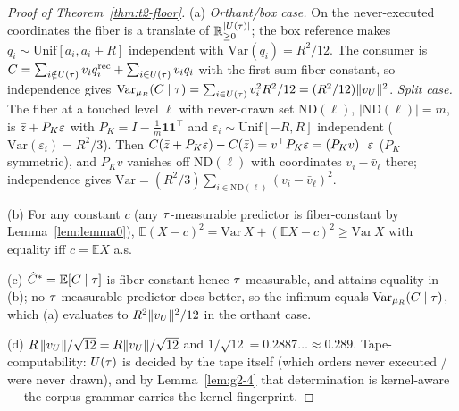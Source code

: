 \begin{proof}[Proof of Theorem~\ref{thm:t2-floor}]
(a) \emph{Orthant/box case.} On the never-executed coordinates the fiber is
a translate of $\mathbb{R}_{\ge 0}^{|U(\tau)|}$; the box reference makes
$q_i \sim \mathrm{Unif}[a_i, a_i + R]$ independent with
$\mathrm{Var}(q_i) = R^2/12$. The consumer is
$C = \sum_{i \notin U(\tau)} v_i q_i^{\mathrm{rec}} + \sum_{i \in U(\tau)}
v_i q_i$ with the first sum fiber-constant, so independence gives
$\mathrm{Var}_{\mu_{R}}(C \mid \tau) = \sum_{i \in U(\tau)} v_i^2 R^2/12 =
(R^2/12)\|v_{U}\|^2$. \emph{Split case.} The fiber at a touched level $\ell$
with never-drawn set $\mathrm{ND}(\ell)$, $|\mathrm{ND}(\ell)| = m$, is
$\bar{z} + P_K\varepsilon$ with
$P_K = I - \tfrac{1}{m}\mathbf{1}\mathbf{1}^{\top}$ and
$\varepsilon_i \sim \mathrm{Unif}[-R,R]$ independent
($\mathrm{Var}(\varepsilon_i) = R^2/3$). Then
$C(\bar{z} + P_K\varepsilon) - C(\bar{z}) =
v^{\top}P_K\varepsilon = (P_Kv)^{\top}\varepsilon$ ($P_K$ symmetric), and
$P_Kv$ vanishes off $\mathrm{ND}(\ell)$ with coordinates
$v_i - \bar{v}_\ell$ there; independence gives
$\mathrm{Var} = (R^2/3)\sum_{i \in \mathrm{ND}(\ell)}(v_i -
\bar{v}_\ell)^2$.

(b) For any constant $c$ (any $\tau$-measurable predictor is fiber-constant
by Lemma~\ref{lem:lemma0}),
$\mathbb{E}(X - c)^2 = \mathrm{Var}\,X + (\mathbb{E}X - c)^2 \ge
\mathrm{Var}\,X$ with equality iff $c = \mathbb{E}X$ a.s.

(c) $\hat{C}^{*} = \mathbb{E}[C \mid \tau]$ is fiber-constant
hence $\tau$-measurable, and attains equality in (b); no
$\tau$-measurable predictor does better, so the infimum equals
$\mathrm{Var}_{\mu_{R}}(C \mid \tau)$, which (a) evaluates to
$R^2\|v_{U}\|^2/12$ in the orthant case.

(d) $R\,\lVert v_{U}\rVert/\sqrt{12} = R\|v_{U}\|/\sqrt{12}$ and $1/\sqrt{12} = 0.2887\ldots
\approx 0.289$. Tape-computability: $U(\tau)$ is decided by the tape itself
(which orders never executed / were never drawn), and by
Lemma~\ref{lem:g2-4} that determination is kernel-aware --- the corpus
grammar carries the kernel fingerprint.


\end{proof}
